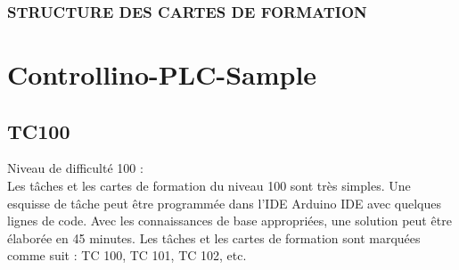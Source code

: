 \documentclass[a4paper,12pt]{report}
\begin{document}
\subsection{STRUCTURE DES CARTES DE FORMATION}
\begin{center}
\label{}
\end{center}
\newpage


\chapter{\textbf{Controllino-PLC-Sample}}
\section{TC100}

Niveau de difficulté 100 :\\

Les tâches et les cartes de formation du niveau 100 sont très simples. Une esquisse de tâche peut être programmée dans l'IDE Arduino IDE avec quelques lignes de code. Avec les connaissances de base appropriées, une solution peut être élaborée en 45 minutes. Les tâches et les cartes de formation sont marquées comme suit : TC 100, TC 101, TC 102, etc.
\end{document}
